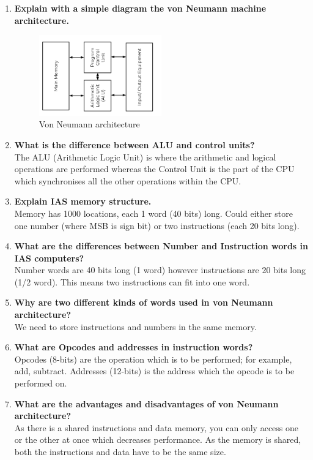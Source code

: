 \begin{enumerate}
    \item \textbf{Explain with a simple diagram the von Neumann machine architecture.}
    \begin{figure}[H]
        \centering
        \includegraphics[width=0.5\textwidth]{assets/von-neumann-architecture.png}
        \caption{Von Neumann architecture}
    \end{figure}

    \item \textbf{What is the difference between ALU and control units?}\\
    The ALU (Arithmetic Logic Unit) is where the arithmetic and logical operations are performed whereas the Control Unit is the part of the CPU which synchronises all the other operations within the CPU.

    \item \textbf{Explain IAS memory structure.}\\
    Memory has 1000 locations, each 1 word (40 bits) long. Could either store one number (where MSB is sign bit) or two instructions (each 20 bits long).

    \item \textbf{What are the differences between Number and Instruction words in IAS computers?}\\
    Number words are 40 bits long (1 word) however instructions are 20 bits long (1/2 word). This means two instructions can fit into one word.

    \item \textbf{Why are two different kinds of words used in von Neumann architecture?}\\
    We need to store instructions and numbers in the same memory.

    \item \textbf{What are Opcodes and addresses in instruction words?}\\
    Opcodes (8-bits) are the operation which is to be performed; for example, add, subtract. Addresses (12-bits) is the address which the opcode is to be performed on.
    
    \item \textbf{What are the advantages and disadvantages of von Neumann architecture?}\\
    As there is a shared instructions and data memory, you can only access one or the other at once which decreases performance. As the memory is shared, both the instructions and data have to be the same size. 
\end{enumerate}